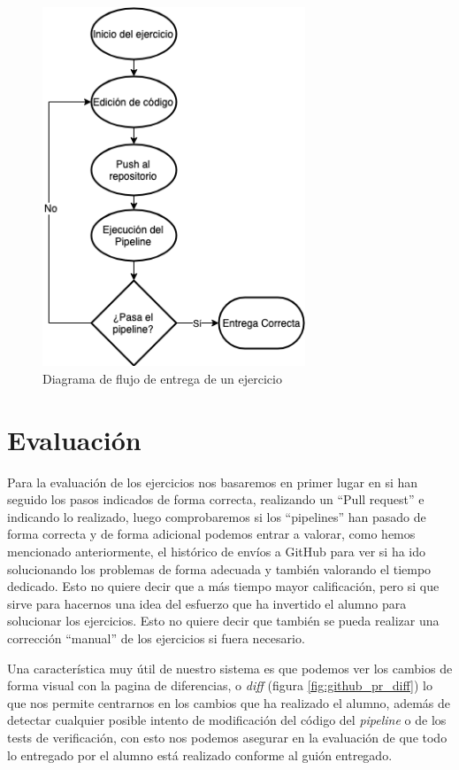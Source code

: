 \begin{figure}[h!]
\centering
\includegraphics[width=0.7\textwidth]{../images/flowchart}
\caption{Diagrama de flujo de entrega de un ejercicio}
\label{fig:flowchart}
\end{figure}


\section{Evaluación}

Para la evaluación de los ejercicios nos basaremos en primer lugar en si han seguido los pasos indicados de forma correcta, realizando un ``Pull request'' e indicando lo realizado, luego comprobaremos si los ``pipelines'' han pasado de forma correcta y de forma adicional podemos entrar a valorar, como hemos mencionado anteriormente, el histórico de envíos a GitHub para ver si ha ido solucionando los problemas de forma adecuada y también valorando el tiempo dedicado. Esto no quiere decir que a más tiempo mayor calificación, pero si que sirve para hacernos una idea del esfuerzo que ha invertido el alumno para solucionar los ejercicios. Esto no quiere decir que también se pueda realizar una corrección ``manual'' de los ejercicios si fuera necesario.

\bigskip
Una característica muy útil de nuestro sistema es que podemos ver los cambios de forma visual con la pagina de diferencias, o \textit{diff} (figura \ref{fig:github_pr_diff}) lo que nos permite centrarnos en los cambios que ha realizado el alumno, además de detectar cualquier posible intento de modificación del código del \textit{pipeline} o de los tests de verificación, con esto nos podemos asegurar en la evaluación de que todo lo entregado por el alumno está realizado conforme al guión entregado.

